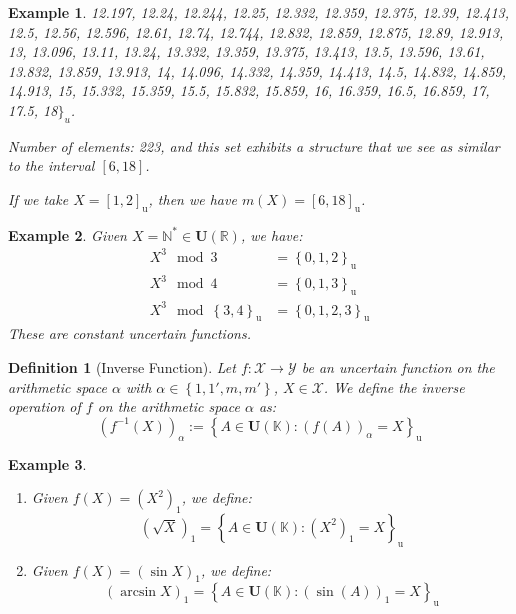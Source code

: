 \documentclass[a4paper,12pt,twoside]{memoir}
\newtheorem{definition}{Definition}[chapter]
\newtheorem{example}{Example}[chapter]
\newcommand{\set}[1]{\left\{#1\right\}} %
\newcommand{\s}[1]{\set{#1}_\mathrm{u}} %
\newcommand{\kbd}[1]{{#1}_\mathrm{u}} %
\newcommand{\tsbd}[1]{\mathbf{U}(\mathbb{#1})}
\newcommand{\kgdd}[1]{\left(#1\right)_1} %
\begin{document}
\begin{example}
12.197,\allowbreak{} 12.24,\allowbreak{} 12.244,\allowbreak{} 12.25,\allowbreak{} 12.332,\allowbreak{} 12.359,\allowbreak{} 12.375,\allowbreak{} 12.39,\allowbreak{} 12.413,\allowbreak{} 12.5,\allowbreak{} 12.56,\allowbreak{} 12.596,\allowbreak{} 12.61,\allowbreak{} 12.74,\allowbreak{} 12.744,\allowbreak{} 12.832,\allowbreak{} 12.859,\allowbreak{} 12.875,\allowbreak{} 12.89,\allowbreak{} 12.913,\allowbreak{} 13,\allowbreak{} 13.096,\allowbreak{} 13.11,\allowbreak{} 13.24,\allowbreak{} 13.332,\allowbreak{} 13.359,\allowbreak{} 13.375,\allowbreak{} 13.413,\allowbreak{} 13.5,\allowbreak{} 13.596,\allowbreak{} 13.61,\allowbreak{} 13.832,\allowbreak{} 13.859,\allowbreak{} 13.913,\allowbreak{} 14,\allowbreak{} 14.096,\allowbreak{} 14.332,\allowbreak{} 14.359,\allowbreak{} 14.413,\allowbreak{} 14.5,\allowbreak{} 14.832,\allowbreak{} 14.859,\allowbreak{} 14.913,\allowbreak{} 15,\allowbreak{} 15.332,\allowbreak{} 15.359,\allowbreak{} 15.5,\allowbreak{} 15.832,\allowbreak{} 15.859,\allowbreak{} 16,\allowbreak{} 16.359,\allowbreak{} 16.5,\allowbreak{} 16.859,\allowbreak{} 17,\allowbreak{} 17.5,\allowbreak{} 18$\}_u$.
		\endgroup
		
		\medskip
		Number of elements: 223, and this set exhibits a structure that we see as similar to the interval $[6,18]$.
		
		If we take $X = \kbd{[1,2]}$, then we have $m(X) = \kbd{[6,18]}$.
	\end{example}
	\begin{example}
		Given $X = \mathbb{N^*} \in \tsbd{R}$, we have:
		\begin{align*}
			X^3 \mod 3       & = \s{0,1,2}   \\
			X^3 \mod 4       & = \s{0,1,3}   \\
			X^3 \mod \s{3,4} & = \s{0,1,2,3}
		\end{align*}
		These are constant uncertain functions.
	\end{example}
	
	\begin{definition}[Inverse Function]
		Let $f : \mathcal{X} \to \mathcal{Y}$ be an uncertain function on the arithmetic space $\alpha$ with $\alpha \in \set{1,1',m,m'}$, $X \in \mathcal{X}$. We define the inverse operation of $f$ on the arithmetic space $\alpha$ as:
		\[
		(f^{-1}(X))_{\alpha} := \s{A \in \tsbd{K}: (f(A))_\alpha = X}
		\]
	\end{definition}
	
	\begin{example}
		\begin{enumerate}[leftmargin=*]
			\item Given $f(X)=\kgdd{X^2}$, we define: \[\kgdd{\sqrt{X}} = \s{A \in \tsbd{K} : \kgdd{X^2} = X}\]
			\item Given $f(X)=\kgdd{\sin{X}}$, we define: \[\kgdd{\arcsin{X}} = \s{A \in \tsbd{K} : \kgdd{\sin(A)} = X}\]
		\end{enumerate}
	\end{example}
	
\end{document}
